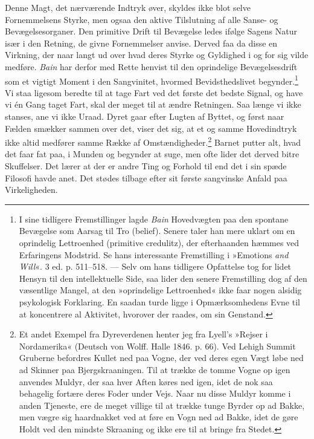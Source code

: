 \documentclass[12pt,a4paper,openany]{book}
\newcommand{\opage}[1]{\marginnote{\footnotesize\textit{[#1]}}}
\begin{document}
Denne Magt, det nærværende Indtryk øver, skyldes ikke blot selve
Fornemmelsens Styrke, men ogsaa den aktive Tilslutning af alle Sanse- og
Bevægelsesorganer. Den primitive Drift til Bevægelse ledes ifølge Sagens
Natur især i den Retning, de givne Fornemmelser anvise. Derved faa da
disse en Virkning, der naar langt ud over hvad deres Styrke og Gyldighed
i og for sig vilde medføre. \emph{Bain} har derfor med Rette henvist til
den oprindelige Bevægelsesdrift som et vigtigt Moment i den Sangvinitet,
hvormed Bevidsthedslivet begynder.\footnote[1]{I sine tidligere
Fremstillinger lagde \emph{Bain} Hovedvægten paa den spontane Bevægelse
som Aarsag til Tro (belief). Senere taler han mere uklart om en
oprindelig Lettroenhed (primitive credulitz), der efterhaanden hæmmes
ved Erfaringens Modstrid. Se hans interessante Fremstilling i »Emotions
\emph{and Will}«. 3 ed. p. 511--518. --- Selv om hans tidligere
Opfattelse tog for lidet Hensyn til den intellektuelle Side, saa lider
den senere Fremstilling dog af den væsentlige Mangel, at den
»oprindelige Lettroenhed« ikke faar nogen alsidig psykologisk
Forklaring. En saadan turde ligge i Opmærksomhedens Evne til at
koncentrere al Aktivitet, hvorover der raades, om sin Genstand.}
\opage{161}Vi staa ligesom beredte til at tage Fart ved det første det
bedste Signal, og have vi én Gang taget Fart, skal der meget til at
ændre Retningen. Saa længe vi ikke stanses, ane vi ikke Uraad. Dyret
gaar efter Lugten af Byttet, og først naar Fælden smækker sammen over
det, viser det sig, at et og samme Hovedindtryk ikke altid medfører
samme Række af Omstændigheder.\footnote[1]{Et andet Exempel fra
Dyreverdenen henter jeg fra Lyell’s »Rejser i Nordamerika« (Deutsch von
Wolff. Halle 1846. p. 66). Ved Lehigh Summit Gruberne befordres Kullet
ned paa Vogne, der ved deres egen Vægt løbe ned ad Skinner paa
Bjergskraaningen. Til at trække de tomme Vogne op igen anvendes Muldyr,
der saa hver Aften køres ned igen, idet de nok saa behagelig fortære
deres Foder under Vejs. Naar nu disse Muldyr komme i anden Tjeneste, ere
de meget villige til at trække tunge Byrder op ad Bakke, men vægre sig
haardnakket ved at føre en Vogn ned ad Bakke, idet de gøre Holdt ved den
mindste Skraaning og ikke ere til at bringe fra Stedet.} Barnet putter
alt, hvad det faar fat paa, i Munden og begynder at suge, men ofte lider
det derved bitre Skuffelser. Det lærer at der er andre Ting og Forhold
til end det i sin spæde Filosofi havde anet. Det stødes tilbage efter
sit første sangvinske Anfald paa Virkeligheden.
\end{document}
